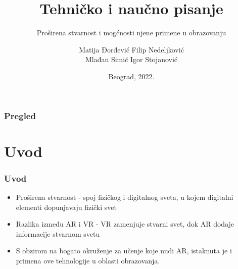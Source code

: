 \documentclass[9pt]{beamer}
\title{Tehničko i naučno pisanje}
\subtitle{Proširena stvarnost i mogćnosti njene primene u obrazovanju}
\author{Matija Đorđević  Filip Nedeljković\\
Mlađan Simić  Igor Stojanović}
\institute{Matematički fakultet\\Univerzitet u Beogradu}
\date{
	\footnotesize{Beograd, 2022.}	
}
\begin{document}
\begin{frame}
	\thispagestyle{empty}
	\titlepage
\end{frame}

\addtocounter{framenumber}{-1}







\begin{frame}
	\frametitle{Pregled} %
	\tableofcontents[hidesubsections] 
\end{frame}

\section{Uvod}

\begin{frame}[fragile]\frametitle{Uvod}
	\begin{itemize}	
 \setlength\itemsep{1.5em}
		\item Proširena stvarnost - spoj fizičkog i digitalnog sveta, u kojem digitalni elementi dopunjavaju fizički svet
		\item Razlika između AR i VR - VR zamenjuje stvarni svet, dok AR dodaje informacije stvarnom svetu
		\item S obzirom na bogato okruženje za učenje koje nudi AR, istaknuta je i primena ove tehnologije u oblasti obrazovanja.
	
	\end{itemize}
\end{frame}
\end{document}
